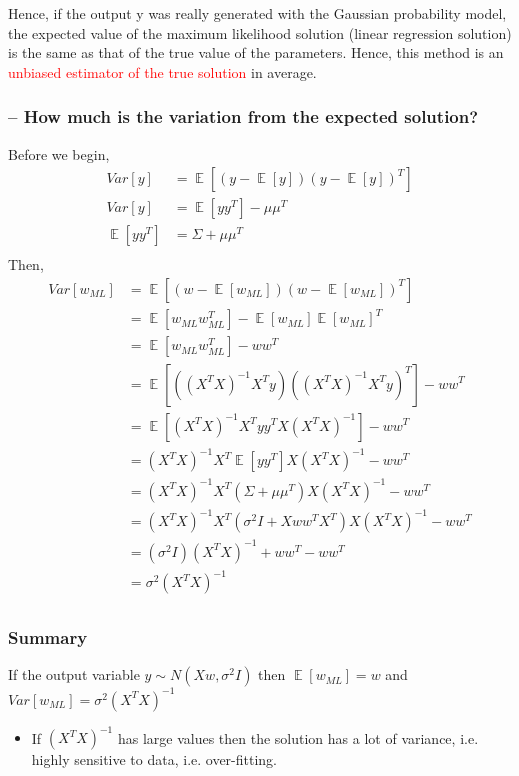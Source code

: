 \documentclass{article}
\DeclareMathOperator*{\E}{\mathop{\mathbb{E}}}
\newcommand{\red}[1]{\textcolor{red}{#1}}
\begin{document}
Hence, if the output y was really generated with the Gaussian probability model, the expected value of the maximum likelihood solution (linear regression solution) is the same as that of the true value of the parameters. Hence, this method is an \red{unbiased estimator of the true solution} in average.

\subsubsection{-- How much is the variation from the expected solution?}
Before we begin,
\begin{align*}
    Var[y] &= \E[(y-\E[y])(y-\E[y])^T]\\
    Var[y] & = \E[yy^T]-\mu\mu^T\\
    \E[yy^T] &= \Sigma + \mu\mu^T\\
\end{align*}
Then,
\begin{align*}
    Var[w_{ML}] &= \E[(w-\E[w_{ML}])(w-\E[w_{ML}])^T]\\
    & = \E[w_{ML}w_{ML}^T]-\E[w_{ML}]\E[w_{ML}]^T\\
    & = \E[w_{ML}w_{ML}^T]-ww^T\\
    & = \E[ ((X^TX)^{-1}X^Ty) ((X^TX)^{-1}X^Ty)^T]-ww^T\\
    & = \E[(X^TX)^{-1}X^Tyy^TX(X^TX)^{-1}]-ww^T\\
    & = (X^TX)^{-1}X^T \E[yy^T] X(X^TX)^{-1} - ww^T\\
    & = (X^TX)^{-1}X^T (\Sigma + \mu\mu^T)  X(X^TX)^{-1} - ww^T\\
    & = (X^TX)^{-1}X^T (\sigma^2I + Xww^TX^T)  X(X^TX)^{-1} - ww^T\\ 
    & = (\sigma^2I)(X^TX)^{-1} + ww^T - ww^T\\
    & = \sigma^2(X^TX)^{-1}\\
\end{align*}

\subsubsection{Summary}
If the output variable $y \sim N(Xw, \sigma^2I)$ then $\E[w_{ML}]=w$ and $Var[w_{ML}]=\sigma^2(X^TX)^{-1}$

\begin{itemize}
    \item If $(X^TX)^{-1}$ has large values then the solution has a lot of variance, i.e. highly sensitive to data, i.e. over-fitting.
\end{itemize}
\end{document}

